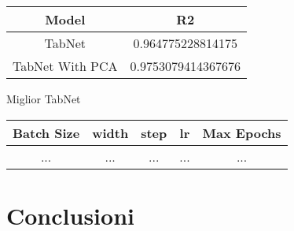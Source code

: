 \documentclass[../../Report.tex]{subfiles}
\begin{document}
\begin{table}[H]
    \centering
    \begin{tabular}{|c|c|}
        \hline
        \textbf{Model} &  \textbf{R2} \\
        \hline
        TabNet              & 0.964775228814175  \\
        TabNet With PCA     & 0.9753079414367676  \\
        \hline
    \end{tabular}
    
    \label{tab:tabnet_resultsR2}
\end{table}

Miglior TabNet
\begin{table}[H]
    \centering
    \begin{tabular}{|c|c|c|c|c|}
        \hline
        \textbf{Batch Size} & \textbf{width}    & \textbf{step} & \textbf{lr}   & \textbf{Max Epochs}\\
        \hline
        ...                & ...                 & ...             & ...          & ...   \\
        \hline
    \end{tabular}
    
    \label{tab:best_tabnet}
\end{table}

\section{Conclusioni}
\end{document}
